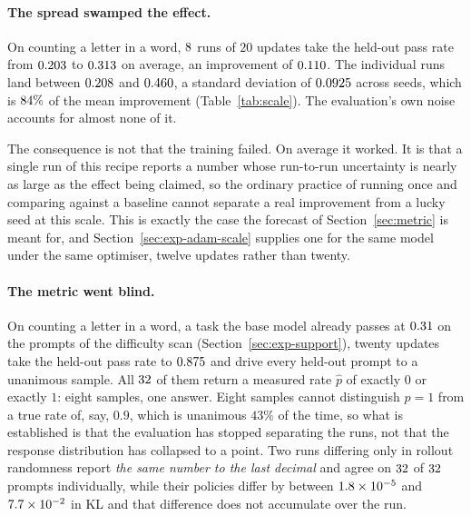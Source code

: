 \paragraph{The spread swamped the effect.} On counting a letter in a word, $8$ runs of
$20$ updates take the held-out pass rate from $0.203$ to $0.313$ on average, an
improvement of $0.110$. The individual runs land between $0.208$ and $0.460$,
a standard deviation of $0.0925$ across seeds, which is $84\%$ of the mean
improvement (Table~\ref{tab:scale}). The evaluation's own noise accounts for almost none of it.

The consequence is not that the training failed. On average it worked. It is that a single run of
this recipe reports a number whose run-to-run uncertainty is nearly as large as the effect being
claimed, so the ordinary practice of running once and comparing against a baseline cannot separate
a real improvement from a lucky seed at this scale. This is exactly the case the forecast of
Section~\ref{sec:metric} is meant for, and Section~\ref{sec:exp-adam-scale} supplies one for the
same model under the same optimiser, twelve updates rather than twenty.

\begin{table}[t]
  \centering
  \footnotesize
  
  \caption{The same measurement at two model sizes. The seed term is given as the bracket of
  Section~\ref{sec:exp-forecast} rather than by subtracting the binomial term, which is the
  conservative reading where a run's record does not establish that its seeds drew independent
  evaluations. Both brackets are narrow, so little turns on the choice here.}
  \label{tab:scale}
\end{table}

\paragraph{The metric went blind.} On counting a letter in a word, a task the base model already
passes at $0.31$ on the prompts of the difficulty scan
(Section~\ref{sec:exp-support}), twenty updates take the held-out pass rate to $0.875$ and
drive every held-out prompt to a unanimous sample. All $32$ of them return a measured
rate $\hat{p}$ of exactly $0$ or exactly $1$: eight samples, one answer. Eight samples cannot
distinguish $\hat{p} = 1$ from a true rate of, say, $0.9$, which is unanimous $43\%$ of the time,
so what is established is that the evaluation has stopped separating the runs, not that the
response distribution has collapsed to a point. Two runs differing only in rollout randomness
report \emph{the same number to the last decimal} and agree on
$32$ of $32$ prompts individually, while their policies differ by between
$1.8\times10^{-5}$ and $7.7\times10^{-2}$ in KL and that difference does not accumulate over the
run.

